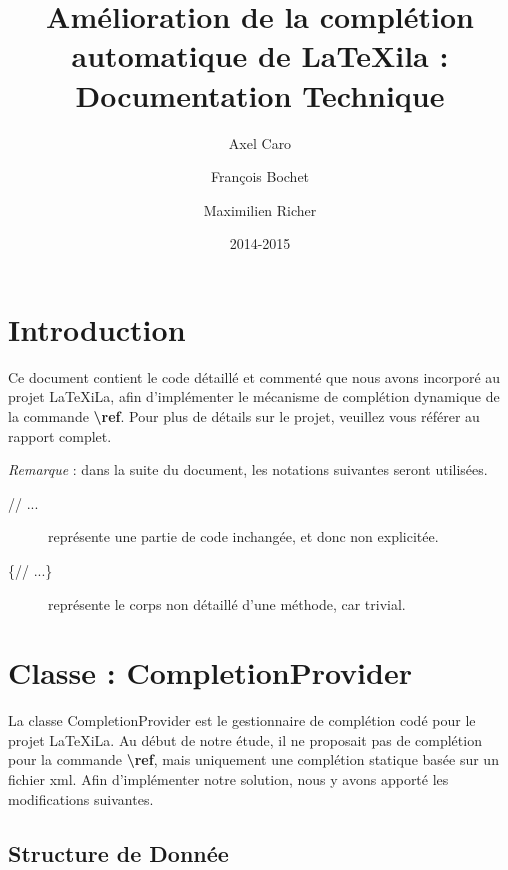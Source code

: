 \documentclass[a4paper,11pt]{report}
\title{Amélioration de la complétion automatique de \LaTeX{}ila : Documentation Technique}
\author{Axel Caro\and François Bochet\and Maximilien Richer}
\date{2014-2015}
\begin{document}


\maketitle %
\tableofcontents %

\chapter{Introduction}
\label{cha:Introduction}
Ce document contient le code détaillé et commenté que nous avons incorporé au projet LaTeXiLa, afin d'implémenter le mécanisme de complétion dynamique de la commande \textbf{\textbackslash{}ref}.
Pour plus de détails sur le projet, veuillez vous référer au rapport complet.

\textit{Remarque} : dans la suite du document, les notations suivantes seront utilisées.

\begin{description}
  \item[// ...] représente une partie de code inchangée, et donc non explicitée.
  \item[\{// ...\}] représente le corps non détaillé d'une méthode, car trivial.
\end{description}

\chapter{Classe : CompletionProvider}
\label{cha:classe_completionProvider}
La classe CompletionProvider est le gestionnaire de complétion codé pour le projet LaTeXiLa.
Au début de notre étude, il ne proposait pas de complétion pour la commande \textbf{\textbackslash{}ref}, mais uniquement une complétion statique basée sur un fichier xml.
Afin d'implémenter notre solution, nous y avons apporté les modifications suivantes.

\section{Structure de Donnée}
\label{sec:CP_structure_de_données}
\end{document}
